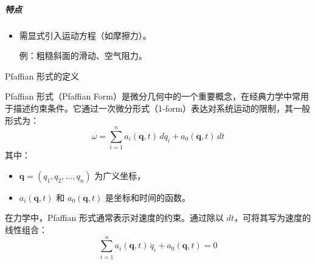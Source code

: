 \documentclass[12pt, a4paper, oneside, UTF8]{ctexbook}  %
\begin{document}
\subparagraph*{特点}
\begin{itemize}
    \item 需显式引入运动方程（如摩擦力）。\par
    例：粗糙斜面的滑动、空气阻力。
\end{itemize}
\begin{add}
    Pfaffian 形式的定义

Pfaffian 形式（Pfaffian Form）是微分几何中的一个重要概念，在经典力学中常用于描述约束条件。它通过一次微分形式（1-form）表达对系统运动的限制，其一般形式为：
\[
\omega = \sum_{i=1}^n a_i(\mathbf{q}, t) \, dq_i + a_0(\mathbf{q}, t) \, dt
\]
其中：
\begin{itemize}
    \item \(\mathbf{q} = (q_1, q_2, \dots, q_n)\) 为广义坐标，
    \item \(a_i(\mathbf{q}, t)\) 和 \(a_0(\mathbf{q}, t)\) 是坐标和时间的函数。
\end{itemize}

在力学中，Pfaffian 形式通常表示对速度的约束。通过除以 \(dt\)，可将其写为速度的线性组合：
\[
\sum_{i=1}^n a_i(\mathbf{q}, t) \, \dot{q}_i + a_0(\mathbf{q}, t) = 0
\]
\end{add}
\end{document}
